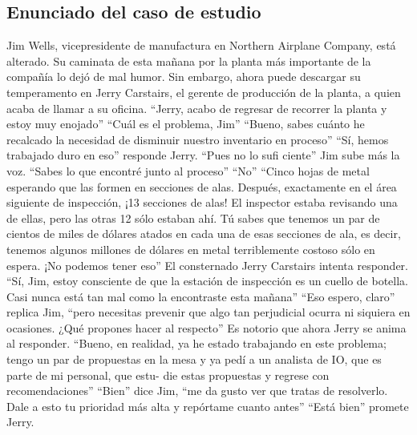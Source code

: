 \documentclass{article}
\begin{document}
\subsection{Enunciado del caso de estudio}
Jim Wells, vicepresidente de manufactura en Northern Airplane Company, está alterado. Su caminata de esta mañana por la
planta más importante de la compañía lo dejó de mal humor.
Sin embargo, ahora puede descargar su temperamento en Jerry
Carstairs, el gerente de producción de la planta, a quien acaba
de llamar a su oficina.
``Jerry, acabo de regresar de recorrer la planta y estoy muy
enojado'' ``Cuál es el problema, Jim'' ``Bueno, sabes cuánto
he recalcado la necesidad de disminuir nuestro inventario en
proceso'' ``Sí, hemos trabajado duro en eso'' responde Jerry.
``Pues no lo sufi ciente'' Jim sube más la voz. ``Sabes lo que
encontré junto al proceso'' ``No'' ``Cinco hojas de metal esperando 
que las formen en secciones de alas. Después, exactamente en el 
área siguiente de inspección, ¡13 secciones de alas!
El inspector estaba revisando una de ellas, pero las otras 12 sólo
estaban ahí. Tú sabes que tenemos un par de cientos de miles
de dólares atados en cada una de esas secciones de ala, es decir,
tenemos algunos millones de dólares en metal terriblemente
costoso sólo en espera. ¡No podemos tener eso''
El consternado Jerry Carstairs intenta responder. ``Sí, Jim,
estoy consciente de que la estación de inspección es un cuello
de botella. Casi nunca está tan mal como la encontraste esta mañana''
``Eso espero, claro'' replica Jim, ``pero necesitas prevenir
que algo tan perjudicial ocurra ni siquiera en ocasiones. ¿Qué
propones hacer al respecto'' Es notorio que ahora Jerry se anima 
al responder. ``Bueno, en realidad, ya he estado trabajando
en este problema; tengo un par de propuestas en la mesa y ya
pedí a un analista de IO, que es parte de mi personal, que estu-
die estas propuestas y regrese con recomendaciones'' ``Bien''
dice Jim, ``me da gusto ver que tratas de resolverlo. Dale a esto
tu prioridad más alta y repórtame cuanto antes'' ``Está bien''
promete Jerry.
\end{document}
